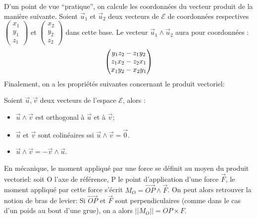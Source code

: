 \documentclass[letterpaper,10pt,english]{jupyterBook}
\begin{document}
\sphinxAtStartPar
D’un point de vue “pratique”, on calcule les coordonnées du vecteur produit de la manière suivante. Soient \(\vec{u}_1\) et \(\vec{u}_2\) deux vecteurs de \(\mathcal{E}\) de coordonnées respectives \(\begin{pmatrix}x_1 \\ y_1 \\ z_1\end{pmatrix}\) et \(\begin{pmatrix}x_2 \\ y_2 \\ z_2\end{pmatrix}\) dans cette base. Le vecteur \(\vec{u}_1 \wedge \vec{u}_2\) aura pour coordonnées :
\begin{equation*}
\begin{split}
\begin{pmatrix}
y_1z_2 - z_1y_2\cr
z_1x_2 - z_2 x_1 \cr
x_1y_2 - x_2y_1\cr
\end{pmatrix}
\end{split}
\end{equation*}
\sphinxAtStartPar
Finalement, on a les propriétés suivantes concernant le produit vectoriel:

\sphinxAtStartPar
{}
Soient \(\vec{u},\vec{v}\)  deux vecteurs de l’espace \(\mathcal{E}\), alors :
\begin{itemize}
\item {} 
\sphinxAtStartPar
\(\vec{u} \wedge \vec{v}\) est orthogonal à \(\vec{u}\) et à \(\vec{v}\);

\item {} 
\sphinxAtStartPar
\(\vec{u}\) et \(\vec{v}\) sont colinéaires ssi \(\vec{u} \wedge \vec{v} =\vec{0}\).

\item {} 
\sphinxAtStartPar
\(\vec{u} \wedge \vec{v} =-\vec{v} \wedge \vec{u}\).

\end{itemize}

\sphinxAtStartPar
{} En mécanique, le moment appliqué par une force se définit au moyen du produit vectoriel: soit O l’axe de référence, P le point d’application d’une force \(\vec{F}\), le moment appliqué par cette force s’écrit \(M_O = \vec{OP} \wedge \vec{F}\). On peut alors retrouver la notion de bras de levier: Si \(\vec{OP}\) et \(\vec{F}\) sont perpendiculaires (comme dans le cas d’un poids au bout d’une grue), on a alors \(||M_O|| = OP \times F\).
\end{document}
